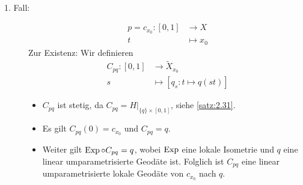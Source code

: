 \begin{beweis}
	\mbox{} \\[-.9cm]
	\begin{description}
		\item[1. Fall:] \begin{align*}
			p = c_{x_0}\colon [0,1] &\longrightarrow X \\
			t &\longmapsto x_0
		\end{align*} 
		Zur Existenz: Wir definieren
		\begin{align*}
			C_{pq}\colon [0,1] &\longrightarrow \tilde{X}_{x_0} \\
			s &\longmapsto [q_s \colon t \mapsto q(st)]
		\end{align*}
		\begin{itemize}
			\item $C_{pq}$ ist stetig, da $C_{pq} = H \big|_{\{q\} \times [0,1]}$, siehe \autoref{satz:2.31}.
			\item Es gilt $C_{pq}(0) = c_{x_0}$ und $C_{pq} = q$.
			\item Weiter gilt $\operatorname{Exp} \circ C_{pq} = q$, wobei $\operatorname{Exp}$ eine lokale Isometrie und $q$ eine linear umparametrisierte Geodäte ist.
			Folglich ist $C_{pq}$ eine linear umparametrisierte lokale Geodäte von $c_{x_0}$ nach $q.$
		\end{itemize}
		

\end{description}
\end{beweis}
